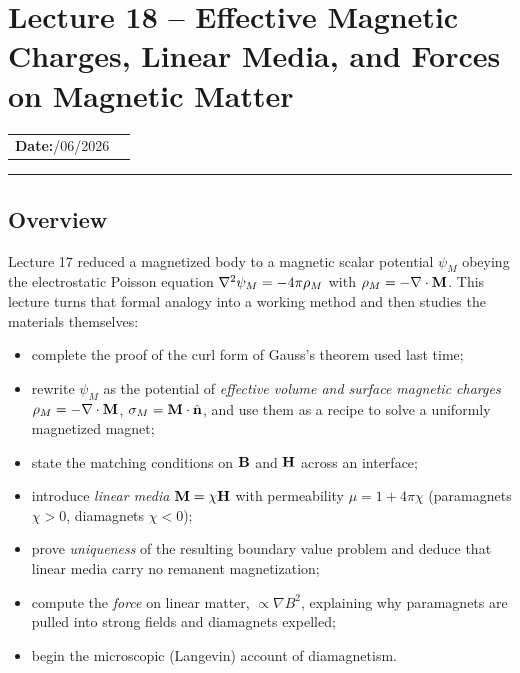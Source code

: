 \section{Lecture 18 -- Effective Magnetic Charges, Linear Media, and Forces on Magnetic Matter}\label{sec:lec18}

\begin{center}
\begin{tabular}{ll}
  \textbf{Date:}\quad 07/06/2026 & \\
\end{tabular}
\end{center}
\hrule\vspace{1.5em}

\subsection*{Overview}

Lecture 17 reduced a magnetized body to a magnetic scalar potential $\psi_M$ obeying the
electrostatic Poisson equation $\nabla^2\psi_M=-4\pi\rho_M$ with $\rho_M=-\nabla \cdot\mathbf{M}$.
This lecture turns that formal analogy into a working method and then studies the
materials themselves:
\begin{itemize}
  \item complete the proof of the curl form of Gauss's theorem used last time;
  \item rewrite $\psi_M$ as the potential of \emph{effective volume and surface magnetic
        charges} $\rho_M=-\nabla \cdot\mathbf{M}$, $\sigma_M=\mathbf{M}\cdot\hat{\mathbf{n}}$, and use them
        as a recipe to solve a uniformly magnetized magnet;
  \item state the matching conditions on $\mathbf{B}$ and $\mathbf{H}$ across an interface;
  \item introduce \emph{linear media} $\mathbf{M}=\chi\mathbf{H}$ with permeability
        $\mu=1+4\pi\chi$ (paramagnets $\chi>0$, diamagnets $\chi<0$);
  \item prove \emph{uniqueness} of the resulting boundary value problem and deduce that
        linear media carry no remanent magnetization;
  \item compute the \emph{force} on linear matter, $\propto\nabla  B^{2}$, explaining why
        paramagnets are pulled into strong fields and diamagnets expelled;
  \item begin the microscopic (Langevin) account of diamagnetism.
\end{itemize}


